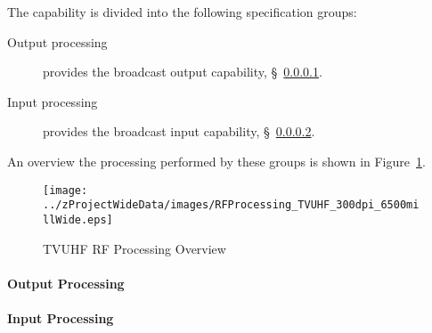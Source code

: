 The \ThisSys \ThisSegment \TVUHF capability is divided into the following specification groups:
\begin{description}
	\item[Output processing] provides the \TVUHF broadcast output capability, \S~\ref{loc:RF_TVUHF_Output}.
	\item[Input processing]  provides the \TVUHF broadcast input  capability, \S~\ref{loc:RF_TVUHF_Input}.
\end{description}
An overview the processing performed by these groups is shown in Figure~\ref{fig:TVUHF_RF_Processing}.
\begin{figure}[htbp]
	\centering
		\texttt{[image: ../zProjectWideData/images/RFProcessing\_TVUHF\_300dpi\_6500millWide.eps]}
	\caption[TVUHF RF Processing Overview]{TVUHF RF Processing Overview}
	\label{fig:TVUHF_RF_Processing}
\end{figure}

\KNEADPARAGRAPHNEWPAGE
\paragraph{\TVUHF \RF Output Processing}
\label{loc:RF_TVUHF_Output}
\renewcommand{\ThisSubSegment}{\TVUHF \RF Output Processing\xspace}%


\KNEADPARAGRAPHNEWPAGE
\paragraph{\TVUHF \RF Input Processing}
\label{loc:RF_TVUHF_Input}
\renewcommand{\ThisSubSegment}{\TVUHF \RF Input Processing\xspace}%

